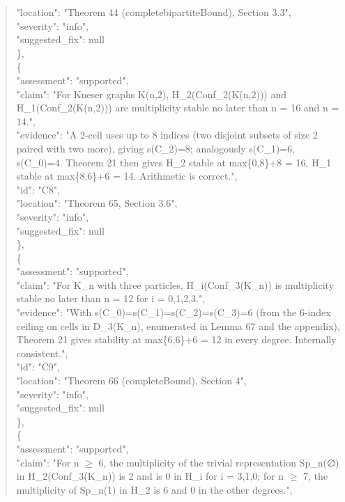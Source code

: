 \documentclass[11pt]{article}
\begin{document}
\begin{quote}
      "location": "Theorem 44 (completebipartiteBound), Section 3.3",\\
      "severity": "info",\\
      "suggested\_fix": null\\
    \},\\
    \{\\
      "assessment": "supported",\\
      "claim": "For Kneser graphs K(n,2), H\_2(Conf\_2(K(n,2))) and H\_1(Conf\_2(K(n,2))) are multiplicity stable no later than n = 16 and n = 14.",\\
      "evidence": "A 2-cell uses up to 8 indices (two disjoint subsets of size 2 paired with two more), giving s(C\_2)=8; analogously s(C\_1)=6, s(C\_0)=4. Theorem 21 then gives H\_2 stable at max\{0,8\}+8 = 16, H\_1 stable at max\{8,6\}+6 = 14. Arithmetic is correct.",\\
      "id": "C8",\\
      "location": "Theorem 65, Section 3.6",\\
      "severity": "info",\\
      "suggested\_fix": null\\
    \},\\
    \{\\
      "assessment": "supported",\\
      "claim": "For K\_n with three particles, H\_i(Conf\_3(K\_n)) is multiplicity stable no later than n = 12 for i = 0,1,2,3.",\\
      "evidence": "With s(C\_0)=s(C\_1)=s(C\_2)=s(C\_3)=6 (from the 6-index ceiling on cells in D\_3(K\_n), enumerated in Lemma 67 and the appendix), Theorem 21 gives stability at max\{6,6\}+6 = 12 in every degree. Internally consistent.",\\
      "id": "C9",\\
      "location": "Theorem 66 (completeBound), Section 4",\\
      "severity": "info",\\
      "suggested\_fix": null\\
    \},\\
    \{\\
      "assessment": "supported",\\
      "claim": "For n \ensuremath{\ge} 6, the multiplicity of the trivial representation Sp\_n(∅) in H\_2(Conf\_3(K\_n)) is 2 and is 0 in H\_i for i = 3,1,0; for n \ensuremath{\ge} 7, the multiplicity of Sp\_n(1) in H\_2 is 6 and 0 in the other degrees.",\\

\end{quote}
\end{document}
